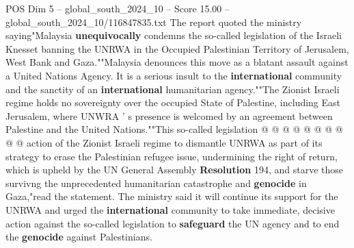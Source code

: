 \begin{textsample}{POS Dim 5 – global\_south\_2024\_10 – Score 15.00 – global\_south\_2024\_10/116847835.txt}
The report quoted the ministry saying"Malaysia \textbf{unequivocally} condemns the so-called legislation of the Israeli Knesset banning the UNRWA in the Occupied Palestinian Territory of Jerusalem, West Bank and Gaza.""Malaysia denounces this move as a blatant assault against a United Nations Agency.
It is a serious insult to the \textbf{international} community and the sanctity of an \textbf{international} humanitarian agency.""The Zionist Israeli regime holds no sovereignty over the occupied State of Palestine, including East Jerusalem, where UNWRA ' s presence is welcomed by an agreement between Palestine and the United Nations.""This so-called legislation @ @ @ @ @ @ @ @ @ @ action of the Zionist Israeli regime to dismantle UNRWA as part of its strategy to erase the Palestinian refugee issue, undermining the right of return, which is upheld by the UN General Assembly \textbf{Resolution} 194, and starve those survivng the unprecedented humanitarian catastrophe and \textbf{genocide} in Gaza,"read the statement.
The ministry said it will continue its support for the UNRWA and urged the \textbf{international} community to take immediate, decisive action against the so-called legislation to \textbf{safeguard} the UN agency and to end the \textbf{genocide} against Palestinians.

\end{textsample}
